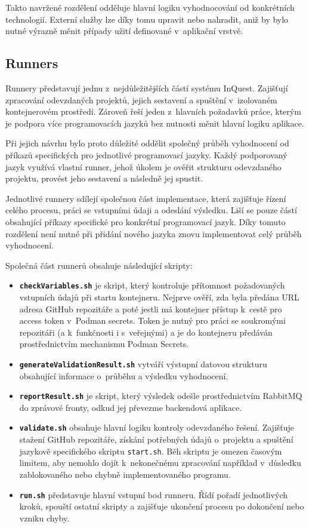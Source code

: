 \documentclass[
  biblatex,
  figures,
  tables,
  glossaries,
  index
]{kidiplom}
\begin{document}
Takto navržené rozdělení odděluje hlavní logiku vyhodnocování od konkrétních technologií. Externí služby lze díky tomu upravit nebo nahradit, aniž by bylo nutné výrazně měnit případy užití definované v~aplikační vrstvě.


\subsection{Runners}
Runnery představují jednu z~nejdůležitějších částí systému InQuest. Zajišťují zpracování odevzdaných projektů, jejich sestavení a spuštění v~izolovaném kontejnerovém prostředí. Zároveň řeší jeden z~hlavních požadavků práce, kterým je podpora více programovacích jazyků bez nutnosti měnit hlavní logiku aplikace.

Při jejich návrhu bylo proto důležité oddělit společný průběh vyhodnocení od příkazů specifických pro jednotlivé programovací jazyky. Každý podporovaný jazyk využívá vlastní runner, jehož úkolem je ověřit strukturu odevzdaného projektu, provést jeho sestavení a následně jej spustit.

Jednotlivé runnery sdílejí společnou část implementace, která zajišťuje řízení celého procesu, práci se vstupními údaji a odeslání výsledku. Liší se pouze částí obsahující příkazy specifické pro konkrétní programovací jazyk. Díky tomuto rozdělení není nutné při přidání nového jazyka znovu implementovat celý průběh vyhodnocení.

Společná část runnerů obsahuje následující skripty:

\begin{itemize}
	\item \textbf{\texttt{checkVariables.sh}} je skript, který kontroluje přítomnost požadovaných vstupních údajů při startu kontejneru. Nejprve ověří, zda byla předána URL adresa GitHub repozitáře a poté jestli má kontejner přístup k~cestě pro access token v~Podman secrets. Token je nutný pro práci se soukromými repozitáři (a k~funkčnosti i s~veřejnými) a je do kontejneru předáván prostřednictvím mechanismu Podman Secrets.
	\item \textbf{\texttt{generateValidationResult.sh}} vytváří výstupní datovou strukturu obsahující informace o~průběhu a výsledku vyhodnocení. 

	\item \textbf{\texttt{reportResult.sh}} je skript, který výsledek odešle prostřednictvím RabbitMQ do zprávové fronty, odkud jej převezme backendová aplikace.
	\item \textbf{\texttt{validate.sh}} obsahuje hlavní logiku kontroly odevzdaného řešení. Zajišťuje stažení GitHub repozitáře, získání potřebných údajů o~projektu a spuštění jazykově specifického skriptu \texttt{start.sh}. Běh skriptu je omezen časovým limitem, aby nemohlo dojít k~nekonečnému zpracování například v~důsledku zablokovaného nebo chybně implementovaného programu.
	\item \textbf{\texttt{run.sh}} představuje hlavní vstupní bod runneru. Řídí pořadí jednotlivých kroků, spouští ostatní skripty a zajišťuje ukončení procesu po dokončení nebo vzniku chyby.
\end{itemize}
\end{document}
